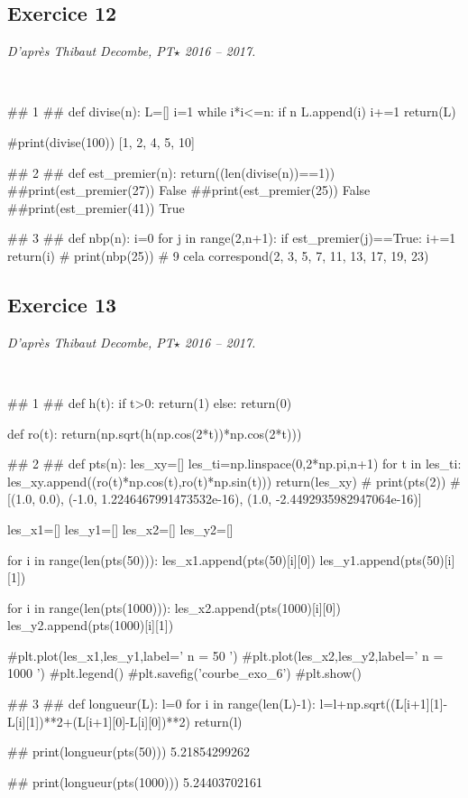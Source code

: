 \documentclass[10pt,fleqn]{article} %
\begin{document}
\subsection*{Exercice 12}
\textit{D'après Thibaut Decombe, PT$\star$ 2016 -- 2017.}
\begin{corrige}
$\quad$
\begin{python}
## 1 ##
def divise(n):
    L=[]
    i=1
    while i*i<=n:
        if n%
            L.append(i)
        i+=1
    return(L)

#print(divise(100)) [1, 2, 4, 5, 10]
    
## 2 ##
def est_premier(n):
    return((len(divise(n))==1))
##print(est_premier(27))    False
##print(est_premier(25))    False
##print(est_premier(41))    True

## 3 ##
def nbp(n):
    i=0
    for j in range(2,n+1):
        if est_premier(j)==True:
            i+=1
    return(i)
# print(nbp(25))
# 9 cela correspond(2, 3, 5, 7, 11, 13, 17, 19, 23)
\end{python}
\end{corrige}

\subsection*{Exercice 13}
\textit{D'après Thibaut Decombe, PT$\star$ 2016 -- 2017.}
\begin{corrige}
$\quad$
\begin{python}
## 1 ##
def h(t):
    if t>0:
        return(1)
    else:
        return(0)
    
def ro(t):
    return(np.sqrt(h(np.cos(2*t))*np.cos(2*t)))
    
## 2 ##
def pts(n):
    les_xy=[]
    les_ti=np.linspace(0,2*np.pi,n+1)
    for t in les_ti:
        les_xy.append((ro(t)*np.cos(t),ro(t)*np.sin(t)))
    return(les_xy)
# print(pts(2))
# [(1.0, 0.0), (-1.0, 1.2246467991473532e-16), (1.0, -2.4492935982947064e-16)]

les_x1=[]
les_y1=[]
les_x2=[]
les_y2=[]

for i in range(len(pts(50))):
    les_x1.append(pts(50)[i][0])
    les_y1.append(pts(50)[i][1])

for i in range(len(pts(1000))):
    les_x2.append(pts(1000)[i][0])
    les_y2.append(pts(1000)[i][1])

#plt.plot(les_x1,les_y1,label=' n = 50 ')
#plt.plot(les_x2,les_y2,label=' n = 1000 ')
#plt.legend()
#plt.savefig('courbe_exo_6')
#plt.show()

## 3 ##
def longueur(L):
    l=0
    for i in range(len(L)-1):
        l=l+np.sqrt((L[i+1][1]-L[i][1])**2+(L[i+1][0]-L[i][0])**2)
    return(l)

## print(longueur(pts(50)))              5.21854299262

## print(longueur(pts(1000)))            5.24403702161
\end{python}
\end{corrige}
\end{document}
